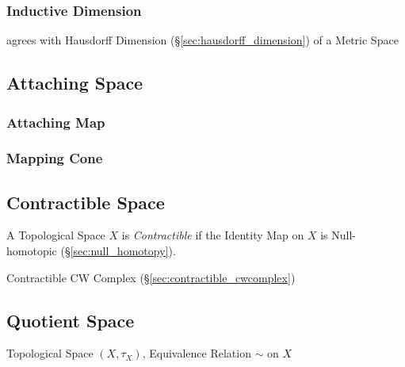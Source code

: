\subsubsection{Inductive Dimension}\label{sec:inductive_dimension}

agrees with Hausdorff Dimension (\S\ref{sec:hausdorff_dimension}) of a Metric
Space



\subsection{Attaching Space}\label{sec:attaching_space}

\subsubsection{Attaching Map}\label{sec:attaching_map}

\subsubsection{Mapping Cone}\label{sec:mapping_cone}



\subsection{Contractible Space}\label{sec:contractible_space}

A Topological Space $X$ is \emph{Contractible} if the Identity Map on
$X$ is Null-homotopic (\S\ref{sec:null_homotopy}).

Contractible CW Complex (\S\ref{sec:contractible_cwcomplex})



\subsection{Quotient Space}\label{sec:quotient_space}

Topological Space $(X, \tau_X)$, Equivalence Relation $\sim$ on $X$

